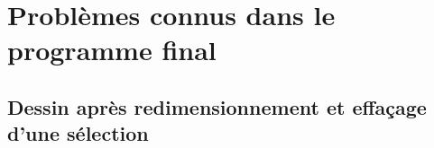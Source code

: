 \section{Problèmes connus dans le programme final}
\subsection{Dessin après redimensionnement et effaçage d'une sélection}